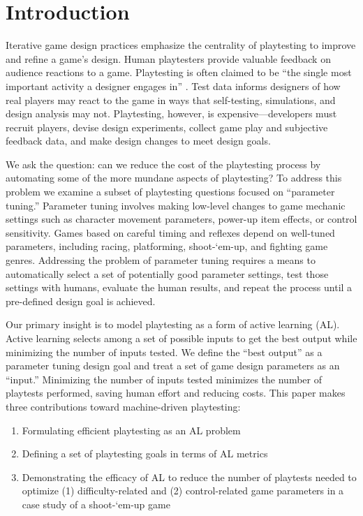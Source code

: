 \documentclass{sig-alternate}
\begin{document}


\section{Introduction}



Iterative game design practices emphasize the centrality of playtesting to improve and refine a game's design.
Human playtesters provide valuable feedback on audience reactions to a game.
Playtesting is often claimed to be ``the single most important activity a designer engages in'' \cite{fullerton2008:playcentric}.
Test data informs designers of how real players may react to the game in ways that self-testing, simulations, and design analysis may not.
Playtesting, however, is expensive---developers must recruit players, devise design experiments, collect game play and subjective feedback data, and make design changes to meet design goals.


We ask the question: can we reduce the cost of the playtesting process by automating some of the more mundane aspects of playtesting?
To address this problem we examine a subset of playtesting questions focused on ``parameter tuning.''
Parameter tuning involves making low-level changes to game mechanic settings such as character movement parameters, power-up item effects, or control sensitivity.
Games based on careful timing and reflexes depend on well-tuned parameters, including racing, platforming, shoot-`em-up, and fighting game genres.
Addressing the problem of parameter tuning requires a means to automatically select a set of potentially good parameter settings, test those settings with humans, evaluate the human results, and repeat the process until a pre-defined design goal is achieved.


Our primary insight is to model playtesting as a form of active learning (AL).
Active learning \cite{settles2012:al-book} selects among a set of possible inputs to get the best output while minimizing the number of inputs tested.
We define the ``best output'' as a parameter tuning design goal and treat a set of game design parameters as an ``input.''
Minimizing the number of inputs tested minimizes the number of playtests performed, saving human effort and reducing costs.
This paper makes three contributions toward machine-driven playtesting:
\begin{enumerate}
\item Formulating efficient playtesting as an AL problem
\item Defining a set of playtesting goals in terms of AL metrics
\item Demonstrating the efficacy of AL to reduce the number of playtests needed to optimize (1) difficulty-related and (2) control-related game parameters in a case study of a shoot-`em-up game
\end{enumerate}
\end{document}
